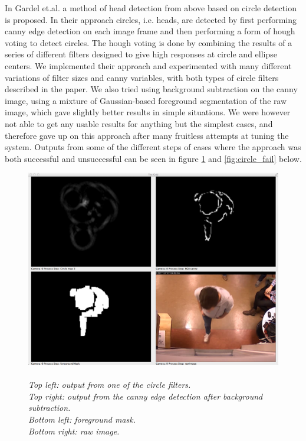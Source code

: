 
In \cite{Gardel} Gardel et.al. a method of head detection from above based on circle detection is proposed. In their approach circles, i.e. heads, are detected by first performing canny edge detection on each image frame and then performing a form of hough voting to detect circles. The hough voting is done by combining the results of a series of different filters designed to give high responses at circle and ellipse centers. We implemented their approach and experimented with many different variations of filter sizes and canny variables, with both types of circle filters described in the paper. We also tried using background subtraction on the canny image, using a mixture of Gaussian-based foreground segmentation \cite{Zivkovic} of the raw image, which gave slightly better results in simple situations. We were however not able to get any usable results for anything but the simplest cases, and therefore gave up on this approach after many fruitless attempts at tuning the system. Outputs from some of the different steps of cases where the approach was both successful and unsuccessful can be seen in figure \ref{fig:circle_success} and \ref{fig:circle_fail} below.
\vspace{1cm}
\begin{figure}[htb]
	\centering
	\includegraphics[width=\linewidth]{images/circle_detection_success.png}
	\caption[An example of a successful Hough-circle detection]{\\\textit{
	Top left: output from one of the circle filters.\\ 
	Top right: output from the canny edge detection after background subtraction.\\ 
	Bottom left: foreground mask.\\ 
	Bottom right: raw image.}}
	\label{fig:circle_success}  %
\end{figure}
